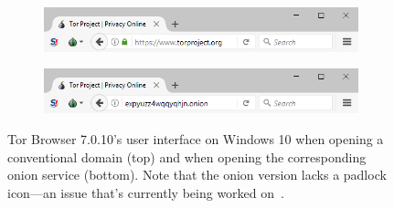 \begin{figure}[t]
    \centering

    \begin{subfigure}[t]{\linewidth}
        \centering
        \includegraphics[width=\linewidth]{figures/non-onion-service.png}
        \label{fig:non-onion-service}
    \end{subfigure}

    \begin{subfigure}[t]{\linewidth}
        \centering
        \includegraphics[width=\linewidth]{figures/onion-service.png}
        \label{fig:onion-service}
    \end{subfigure}

    \caption{Tor Browser 7.0.10's user interface on Windows 10 when opening a
    conventional domain (top) and when opening the corresponding onion service
    (bottom).  Note that the onion version lacks a padlock icon---an issue
    that's currently being worked on~\cite{trac23247}.}
\end{figure}
